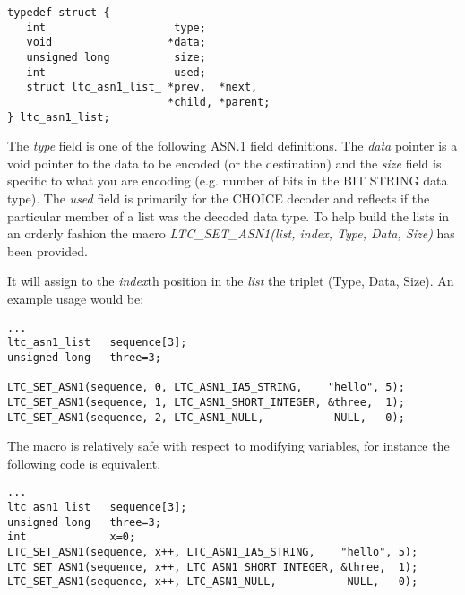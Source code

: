 \documentclass[synpaper]{book}
\begin{document}
\begin{verbatim}
typedef struct {
   int                    type;
   void                  *data;
   unsigned long          size;
   int                    used;
   struct ltc_asn1_list_ *prev,  *next, 
                         *child, *parent;
} ltc_asn1_list;
\end{verbatim}

The \textit{type} field is one of the following ASN.1 field definitions.  The \textit{data} pointer is a void pointer to the data to be encoded (or the destination) and the 
\textit{size} field is specific to what you are encoding (e.g. number of bits in the BIT STRING data type).  The \textit{used} field is primarily for the CHOICE decoder
and reflects if the particular member of a list was the decoded data type.  To help build the lists in an orderly fashion the macro
\textit{LTC\_SET\_ASN1(list, index, Type, Data, Size)} has been provided.

It will assign to the \textit{index}th position in the \textit{list} the triplet (Type, Data, Size).  An example usage would be:

\begin{small}
\begin{verbatim}
...
ltc_asn1_list   sequence[3];
unsigned long   three=3;

LTC_SET_ASN1(sequence, 0, LTC_ASN1_IA5_STRING,    "hello", 5);
LTC_SET_ASN1(sequence, 1, LTC_ASN1_SHORT_INTEGER, &three,  1);
LTC_SET_ASN1(sequence, 2, LTC_ASN1_NULL,           NULL,   0);
\end{verbatim}
\end{small}

The macro is relatively safe with respect to modifying variables, for instance the following code is equivalent.

\begin{small}
\begin{verbatim}
...
ltc_asn1_list   sequence[3];
unsigned long   three=3;
int             x=0;
LTC_SET_ASN1(sequence, x++, LTC_ASN1_IA5_STRING,    "hello", 5);
LTC_SET_ASN1(sequence, x++, LTC_ASN1_SHORT_INTEGER, &three,  1);
LTC_SET_ASN1(sequence, x++, LTC_ASN1_NULL,           NULL,   0);
\end{verbatim}
\end{small}
\end{document}
